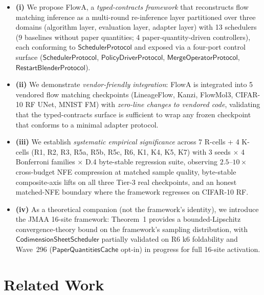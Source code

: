 \documentclass[journal,twocolumn,final]{IEEEtran}
\begin{document}
\begin{itemize}
\item \textbf{(i)} We propose FlowA, a \emph{typed-contracts framework} that
reconstructs flow matching inference as a multi-round re-inference layer
partitioned over three domains (algorithm layer, evaluation layer, adapter
layer) with 13 schedulers (9 baselines without paper quantities; 4
paper-quantity-driven controllers), each conforming to $\mathsf{SchedulerProtocol}$
and exposed via a four-port control surface ($\mathsf{SchedulerProtocol}$,
$\mathsf{PolicyDriverProtocol}$, $\mathsf{MergeOperatorProtocol}$,
$\mathsf{RestartBlenderProtocol}$).

\item \textbf{(ii)} We demonstrate \emph{vendor-friendly integration}: FlowA
is integrated into 5 vendored flow matching checkpoints (LineageFlow, Kanzi,
FlowMol3, CIFAR-10 RF UNet, MNIST FM) with \emph{zero-line changes to
vendored code}, validating that the typed-contracts surface is sufficient to
wrap any frozen checkpoint that conforms to a minimal adapter protocol.

\item \textbf{(iii)} We establish \emph{systematic empirical significance}
across 7 R-cells + 4 K-cells (R1, R2, R3, R5a, R5b, R5c, R6, K1, K4, K5, K7)
with 3 seeds $\times$ 4 Bonferroni families $\times$ D.4 byte-stable
regression suite, observing $2.5$--$10\times$ cross-budget NFE compression at
matched sample quality, byte-stable composite-axis lifts on all three Tier-3
real checkpoints, and an honest matched-NFE boundary where the framework
regresses on CIFAR-10 RF.

\item \textbf{(iv)} As a theoretical companion (not the framework's
identity), we introduce the JMAA 16-site framework: Theorem~1 provides a
bounded-Lipschitz convergence-theory bound on the framework's sampling
distribution, with $\mathsf{CodimensionSheetScheduler}$ partially validated on
R6 k6 foldability and Wave~296 ($\mathsf{PaperQuantitiesCache}$ opt-in) in
progress for full 16-site activation.
\end{itemize}

\section{Related Work}\label{sec:related}
\end{document}
